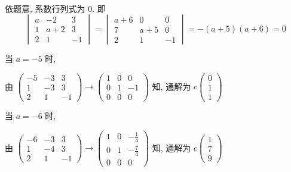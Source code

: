 	 \paragraph{} %
		 依题意, 系数行列式为 0. 即
		 \[ \begin{vmatrix}
				 a & -2  & 3  \\
				 1 & a+2 & 3  \\
				 2 & 1   & -1
			 \end{vmatrix} = \begin{vmatrix}
				 a+6 & 0   & 0  \\
				 7   & a+5 & 0  \\
				 2   & 1   & -1
			 \end{vmatrix} = -(a+5)(a+6) = 0 \]

		 当 \( a = -5 \) 时,

		 由 \( \begin{pmatrix}
			 -5 & -3 & 3  \\
			 1  & -3 & 3  \\
			 2  & 1  & -1
		 \end{pmatrix} \rightarrow \begin{pmatrix}
			 1 & 0 & 0  \\
			 0 & 1 & -1 \\
			 0 & 0 & 0
		 \end{pmatrix} \) 知, 通解为 \( c\begin{pmatrix}
			 0 \\
			 1 \\
			 1
		 \end{pmatrix} \)


		 当 \( a = -6 \) 时,

		 由 \( \begin{pmatrix}
			 -6 & -3 & 3  \\
			 1  & -4 & 3  \\
			 2  & 1  & -1
		 \end{pmatrix} \rightarrow \begin{pmatrix}
			 1 & 0 & -\frac{1}{4} \\
			 0 & 1 & -\frac{7}{4} \\
			 0 & 0 & 0
		 \end{pmatrix} \) 知, 通解为 \( c\begin{pmatrix}
			 1 \\
			 7 \\
			 9
		 \end{pmatrix} \)


